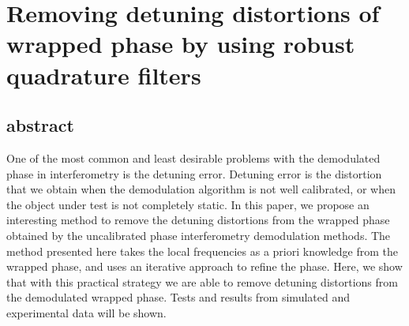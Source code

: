 \chapter{Removing detuning distortions of wrapped phase by using robust 
 quadrature filters}

\section{abstract}One of the most common and least desirable problems with
the 
demodulated phase in interferometry is the detuning error. Detuning error is 
the distortion that we obtain when the demodulation algorithm is not well 
calibrated, or when the object under test is not completely static. In this 
paper, we propose an interesting method to remove the detuning distortions from 
the wrapped phase obtained by the uncalibrated phase interferometry 
demodulation methods. The method presented here takes the local frequencies as 
a priori knowledge from the wrapped phase, and uses an iterative approach to 
refine the phase. Here, we show that with this practical strategy we are able 
to remove detuning distortions from the demodulated wrapped phase. Tests and
results from simulated and experimental data will be shown.

 



